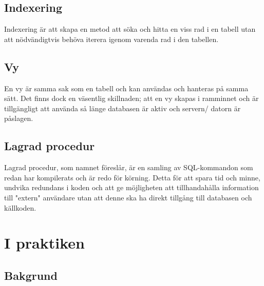 \documentclass[10pt]{article}
\begin{document}

\subsection{Indexering}

Indexering är att skapa en metod att söka och hitta en viss rad i en tabell utan att nödvändigtvis behöva iterera igenom varenda rad i den tabellen.

\subsection{Vy}

En vy är samma sak som en tabell och kan användas och hanteras på samma sätt. Det finns dock en väsentlig skillnaden; att en vy skapas i ramminnet och är tillgängligt att använda så länge databasen är aktiv och servern/ datorn är påslagen.

\subsection{Lagrad procedur}

Lagrad procedur, som namnet föreslår, är en samling av SQL-kommandon som redan har kompilerats och är redo för körning. Detta för att spara tid och minne, undvika redundans i koden och att ge möjligheten att tillhandahålla information till "extern" användare utan att denne ska ha direkt tillgång till databasen och källkoden.

\section{I praktiken}

\subsection{Bakgrund}
\end{document}
